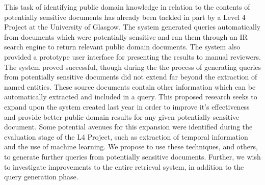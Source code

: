 \documentclass{mprop}
\begin{document}
This task of identifying public domain knowledge in relation to the contents of potentially sensitive documents has already been tackled in part by a Level 4 Project at the University of Glasgow. 
The system generated queries automatically from documents which were potentially sensitive and ran them through an IR search engine to return relevant public domain documents.
The system also provided a prototype user interface for presenting the results to manual reviewers.
The system proved successful, though during the the process of generating queries from potentially sensitive documents did not extend far beyond the extraction of named entities. 
These source documents contain other information which can be automatically extracted and included in a query.
This proposed research seeks to expand upon the system created last year in order to improve it's effectiveness and provide better public domain results for any given potentially sensitive document.
Some potential avenues for this expansion were identified during the evaluation stage of the L4 Project, such as extraction of temporal information and the use of machine learning.
We propose to use these techniques, and others, to generate further queries from potentially sensitive documents.
Further, we wish to investigate improvements to the entire retrieval system, in addition to the query generation phase.



\end{document}
